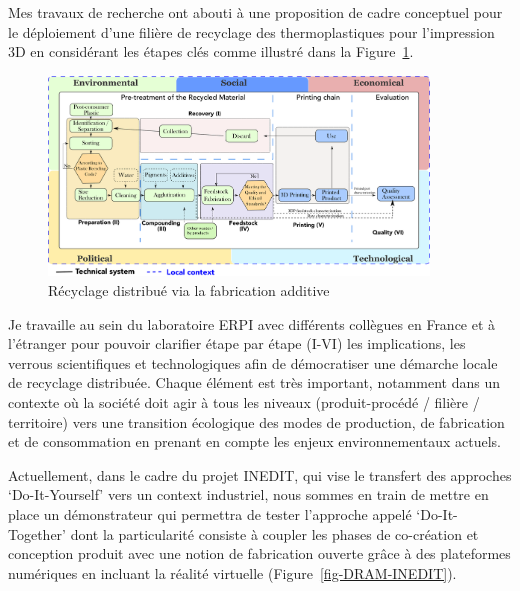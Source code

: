 \documentclass[
  11pt,
]{article}
\begin{document}
Mes travaux de recherche ont abouti à une proposition de cadre
conceptuel pour le déploiement d'une filière de recyclage des
thermoplastiques pour l'impression 3D en considérant les étapes clés
comme illustré dans la Figure~\ref{fig-sdram}.

\begin{figure}[H]

{\centering \includegraphics[width=0.9\textwidth,height=\textheight]{Figures/SDRAM-00.pdf}

}

\caption{\label{fig-sdram}Récyclage distribué via la fabrication
additive}

\end{figure}

Je travaille au sein du laboratoire ERPI avec différents collègues en
France et à l'étranger pour pouvoir clarifier étape par étape (I-VI) les
implications, les verrous scientifiques et technologiques afin de
démocratiser une démarche locale de recyclage distribuée. Chaque élément
est très important, notamment dans un contexte où la société doit agir à
tous les niveaux (produit-procédé / filière / territoire) vers une
transition écologique des modes de production, de fabrication et de
consommation en prenant en compte les enjeux environnementaux actuels.

Actuellement, dans le cadre du projet INEDIT, qui vise le transfert des
approches `Do-It-Yourself' vers un context industriel, nous sommes en
train de mettre en place un démonstrateur qui permettra de tester
l'approche appelé `Do-It-Together' dont la particularité consiste à
coupler les phases de co-création et conception produit avec une notion
de fabrication ouverte grâce à des plateformes numériques en incluant la
réalité virtuelle (Figure~\ref{fig-DRAM-INEDIT}).
\end{document}
